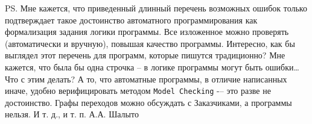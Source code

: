 \documentclass[12pt, twoside]{report}
\begin{document}
PS. Мне кажется, что приведенный длинный перечень возможных ошибок только подтверждает такое достоинство
автоматного программирования как формализация задания логики программы. Все изложенное можно
проверять (автоматически и вручную), повышая качество программы. Интересно, как бы выглядел этот
перечень для программ, которые пишутся традиционно? Мне кажется, что была бы одна строчка – в логике
программы могут быть ошибки… Что с этим делать? А то, что автоматные программы, в отличие написанных
иначе, удобно верифицировать методом \texttt{Model Checking} -– это разве не достоинство. Графы переходов можно
обсуждать с Заказчиками, а программы нельзя. И т. д., и т. п. А.А. Шалыто

\newpage
\thispagestyle{empty}


\newpage
\listoffigures
\end{document}
